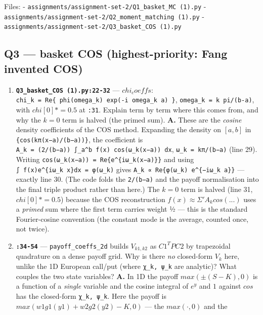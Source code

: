 \documentclass[
  11pt,
]{article}
\begin{document}
Files: - \texttt{assignments/assignment-set-2/Q1\_basket\_MC\ (1).py} -
\texttt{assignments/assignment-set-2/Q2\_moment\_matching\ (1).py} -
\texttt{assignments/assignment-set-2/Q3\_basket\_COS\ (1).py}

\hypertarget{q3-basket-cos-highest-priority-fang-invented-cos}{%
\subsection{Q3 --- basket COS (highest-priority: Fang invented
COS)}\label{q3-basket-cos-highest-priority-fang-invented-cos}}

\begin{enumerate}
\def\labelenumi{\arabic{enumi}.}
\item
  \textbf{\texttt{Q3\_basket\_COS\ (1).py:22-32}} --- \(chi_coeffs\):
  \texttt{chi\_k\ =\ Re\{\ phi(omega\_k)\ exp(-i\ omega\_k\ a)\ \}},
  \texttt{omega\_k\ =\ k\ pi/(b-a)}, with \(chi[0] *= 0.5\) at
  \texttt{:31}. Explain term by term where this comes from, and why the
  \(k=0\) term is halved (the primed sum). \textbf{A.} These are the
  \emph{cosine} density coefficients of the COS method. Expanding the
  density on \([a,b]\) in \texttt{\{cos(kπ(x−a)/(b−a))\}}, the
  coefficient is
  \texttt{A\_k\ =\ (2/(b−a))\ ∫\_a\^{}b\ f(x)\ cos(ω\_k(x−a))\ dx},
  \texttt{ω\_k\ =\ kπ/(b−a)} (line 29). Writing
  \texttt{cos(ω\_k(x−a))\ =\ Re\{e\^{}\{iω\_k(x−a)\}\}} and using
  \texttt{∫\ f(x)e\^{}\{iω\_k\ x\}dx\ =\ φ(ω\_k)} gives
  \texttt{A\_k\ ∝\ Re\{φ(ω\_k)\ e\^{}\{−iω\_k\ a\}\}} --- exactly line
  30. (The code folds the \texttt{2/(b−a)} and the payoff normalisation
  into the final triple product rather than here.) The \(k=0\) term is
  halved (line 31, \(chi[0] *= 0.5\)) because the COS reconstruction
  \(f(x) ≈ Σ' A_k cos(...)\) uses a \emph{primed} sum where the first
  term carries weight ½ --- this is the standard Fourier-cosine
  convention (the constant mode is the average, counted once, not
  twice).
\item
  \textbf{\texttt{:34-54}} --- \texttt{payoff\_coeffs\_2d} builds
  \(V_{k1,k2}\) as \(C1^T P C2\) by trapezoidal quadrature on a dense
  payoff grid. Why is there \emph{no} closed-form \(V_k\) here, unlike
  the 1D European call/put (where \texttt{χ\_k,\ ψ\_k} are analytic)?
  What couples the two state variables? \textbf{A.} In 1D the payoff
  \(max(±(S−K),0)\) is a function of a \emph{single} variable and the
  cosine integral of \(e^y\) and \(1\) against \(cos\) has the
  closed-form \texttt{χ\_k,\ ψ\_k}. Here the payoff is
  \(max(w1 g1(y1) + w2 g2(y2) − K, 0)\) --- the \(max(·,0)\) and the

\end{enumerate}
\end{document}
